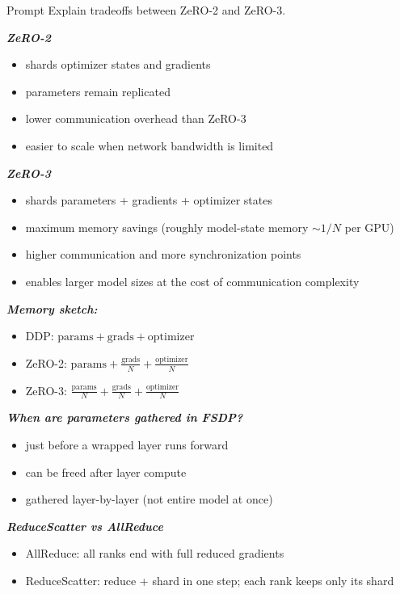 \documentclass[12pt]{article}
\let\origtextbf\textbf
\renewcommand{\textbf}[1]{\origtextbf{\textit{#1}}}
\begin{document}
\begin{greenbox}{Prompt}
Explain tradeoffs between ZeRO-2 and ZeRO-3.

\textbf{ZeRO-2}
\begin{itemize}
\item shards optimizer states and gradients
\item parameters remain replicated
\item lower communication overhead than ZeRO-3
\item easier to scale when network bandwidth is limited
\end{itemize}

\textbf{ZeRO-3}
\begin{itemize}
\item shards parameters + gradients + optimizer states
\item maximum memory savings (roughly model-state memory \(\sim 1/N\) per GPU)
\item higher communication and more synchronization points
\item enables larger model sizes at the cost of communication complexity
\end{itemize}

\textbf{Memory sketch:}
\begin{itemize}
\item DDP: \(\text{params} + \text{grads} + \text{optimizer}\)
\item ZeRO-2: \(\text{params} + \frac{\text{grads}}{N} + \frac{\text{optimizer}}{N}\)
\item ZeRO-3: \(\frac{\text{params}}{N} + \frac{\text{grads}}{N} + \frac{\text{optimizer}}{N}\)
\end{itemize}

\textbf{When are parameters gathered in FSDP?}
\begin{itemize}
\item just before a wrapped layer runs forward
\item can be freed after layer compute
\item gathered layer-by-layer (not entire model at once)
\end{itemize}

\textbf{ReduceScatter vs AllReduce}
\begin{itemize}
\item AllReduce: all ranks end with full reduced gradients
\item ReduceScatter: reduce + shard in one step; each rank keeps only its shard
\end{itemize}
\end{greenbox}
\end{document}
